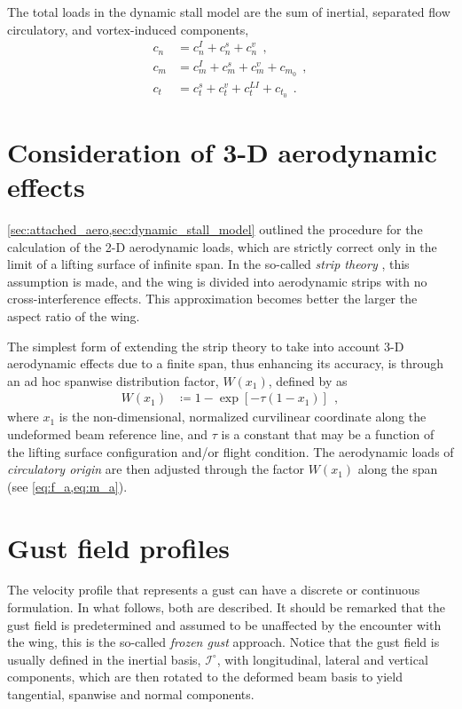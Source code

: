 \documentclass[12pt,a4paper,oneside,english]{abntex2} %
\def\lb{\left[}
\def\rb{\right]}
\def\lp{\left(}
\def\rp{\right)}
\begin{document}
The total loads in the dynamic stall model are the sum of inertial, separated flow circulatory, and vortex-induced components,
\begin{align}
    c_n &= c_n^I + c_n^s + c_n^v \ \ ,
    \label{eq:cn_dsm}
    \\
    c_m &= c_m^I + c_m^s + c_m^v + c_{m_0} \ \ ,
    \label{eq:cm_dsm}
    \\
    c_t &= c_t^s + c_t^v + c_t^{LI} + c_{t_0} \ \ .
    \label{eq:ct_dsm}
\end{align}


\section{Consideration of 3-D aerodynamic effects}
\label{sec:3D_aero}

\cref{sec:attached_aero,sec:dynamic_stall_model} outlined the procedure for the calculation of the 2-D aerodynamic loads, which are strictly correct only in the limit of a lifting surface of infinite span. In the so-called \textit{strip theory} \cite{hodges2011introduction}, this assumption is made, and the wing is divided into aerodynamic strips with no cross-interference effects. This approximation becomes better the larger the aspect ratio of the wing.

The simplest form of extending the strip theory to take into account 3-D aerodynamic effects due to a finite span, thus enhancing its accuracy, is through an ad hoc spanwise distribution factor, $W(x_1)$, defined by  as
\begin{align}
    W(x_1) &\coloneqq 1 - \exp\lb -\tau\lp1-x_1\rp \rb \ \ ,
    \label{eq:tip_corr_fac}
\end{align}
where $x_1$ is the non-dimensional, normalized curvilinear coordinate along the undeformed beam reference line, and $\tau$ is a constant that may be a function of the lifting surface configuration and/or flight condition. The aerodynamic loads of \textit{circulatory origin} are then adjusted through the factor $W(x_1)$ along the span (see \cref{eq:f_a,eq:m_a}).


\section{Gust field profiles}
\label{sec:gust_profiles}

The velocity profile that represents a gust can have a discrete or continuous formulation. In what follows, both are described. It should be remarked that the gust field is predetermined and assumed to be unaffected by the encounter with the wing, this is the so-called \textit{frozen gust} approach. Notice that the gust field is usually defined in the inertial basis, $\mathcal{I}^{\circ}$, with longitudinal, lateral and vertical components, which are then rotated to the deformed beam basis to yield tangential, spanwise and normal components.
\end{document}
